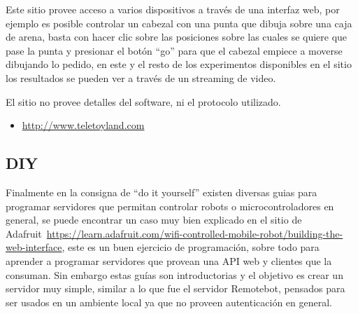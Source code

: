 Este sitio provee acceso a varios dispositivos a través de una interfaz web,
por ejemplo es posible controlar un cabezal con una punta que dibuja sobre
una caja de arena, basta con hacer clic sobre las posiciones sobre las cuales
se quiere que pase la punta y presionar el botón ``go'' para que el cabezal
empiece a moverse dibujando lo pedido, en este y el resto de los experimentos
disponibles en el sitio los resultados se pueden ver a través de un streaming
de video.

El sitio no provee detalles del software, ni el protocolo utilizado.

\begin{itemize}
    \item \url{http://www.teletoyland.com}
\end{itemize}

\subsection{DIY}
Finalmente en la consigna de ``do it yourself'' existen diversas guias para
programar servidores que permitan controlar robots o microcontroladores
en general, se puede encontrar un caso muy bien explicado en el sitio
de Adafruit~\url{https://learn.adafruit.com/wifi-controlled-mobile-robot/building-the-web-interface},
este es un buen ejercicio de programación, sobre todo para aprender a
programar servidores que provean una API web y clientes que la consuman. Sin
embargo estas guías son introductorias y el objetivo es crear un servidor
muy simple, similar a lo que fue el servidor Remotebot, pensados para ser
usados en un ambiente local ya que no proveen autenticación en general.

